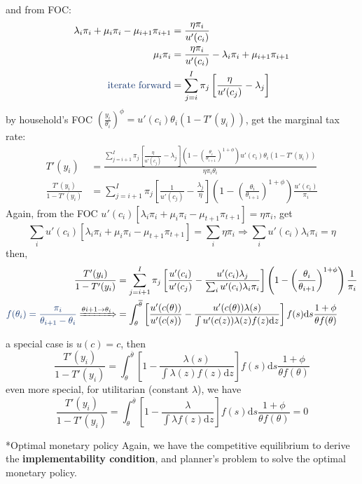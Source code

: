 \documentclass[10pt,landscape,a4paper]{article}
\makeatletter
\let\bar\overline
\renewcommand{\section}{\@startsection{section}{1}{0mm}{1ex}{.2ex}{\normalsize\bfseries}}
\makeatother
\begin{document}
\begin{multicols*}{3}
and from FOC:
\begin{align*}
    \lambda_i\pi_i +\mu_i\pi_i -\mu_{i+1}\pi_{i+1}&=\frac{\eta\pi_i}{u'(c_i)}\\
    \mu_i\pi_i &= \frac{\eta\pi_i}{u'(c_i)}-\lambda_i\pi_i +\mu_{i+1}\pi_{i+1}\\
    \text{\color{myblue}iterate forward} &= \sum^I_{j=i}\pi_j\left[\frac{\eta}{u'(c_j)}-\lambda_j\right]
\end{align*}
by household's FOC $\left(\frac{y_i}{\theta_i}\right)^{\phi} = u'(c_i)\theta_i(1-T'(y_i))$, get the marginal tax rate:
\begin{align*}
    T'(y_i) &= \frac{\sum^I_{j=i+1}\pi_j\left[\frac{\eta}{u'(c_j)}-\lambda_j\right] \left(1- \left(\frac{\theta_i}{\theta_{i+1}}\right)^{1+\phi}\right) u'(c_i)\theta_i(1-T'(y_i))}{\eta\pi_i\theta_i}\\
    \frac{T'(y_i)}{1-T'(y_i)} &= \sum^I_{j=i+1}\pi_j\left[\frac{1}{u'(c_j)}-\frac{\lambda_j}{\eta}\right] \left(1- \left(\frac{\theta_i}{\theta_{i+1}}\right)^{1+\phi}\right) \frac{u'(c_i)}{\pi_i}
\end{align*}
Again, from the FOC $u'(c_i)[\lambda_i\pi_i+\mu_i\pi_i-\mu_{t+1}\pi_{t+1}]=\eta \pi_i$, get
$$
\sum_i u'(c_i)[\lambda_i\pi_i+\mu_i\pi_i-\mu_{t+1}\pi_{t+1}]=\sum_i \eta \pi_i \Rightarrow \sum_i u'(c_i)\lambda_i\pi_i = \eta
$$
then, 
\begin{align*}
    \frac{T'(y_i)}{1-T'(y_i)} &= \sum^I_{j=i+1}\pi_j\left[\frac{u'(c_i)}{u'(c_j)}-\frac{u'(c_i)\lambda_j}{\sum_iu'(c_i)\lambda_i\pi_i}\right] \left(1- \left(\frac{\theta_i}{\theta_{i+1}}\right)^{1+\phi}\right) \frac{1}{\pi_i}\\
   {\color{myblue}f(\theta_i)=\frac{\pi_i}{\theta_{i+1}-\theta_i}} \xRightarrow{\theta{i+1}\rightarrow\theta_i} &= \int^{\bar{\theta}}_{\theta}\left[\frac{u'(c(\theta))}{u'(c(s))} - \frac{u'(c(\theta))\lambda(s)}{\int u'(c(z))\lambda(z)f(z)\mathrm{d}z}\right]f(s)\mathrm{d}s\frac{1+\phi}{\theta f(\theta)}
\end{align*}

a special case is $u(c)=c$, then 
$$
\frac{T'(y_i)}{1-T'(y_i)}=\int^{\bar{\theta}}_{\theta}\left[1 - \frac{\lambda(s)}{\int \lambda(z)f(z)\mathrm{d}z}\right]f(s)\mathrm{d}s\frac{1+\phi}{\theta f(\theta)}
$$
even more special, for utilitarian (constant $\lambda$), we have
$$
\frac{T'(y_i)}{1-T'(y_i)}=\int^{\bar{\theta}}_{\theta}\left[1 - \frac{\lambda}{\int \lambda f(z)\mathrm{d}z}\right]f(s)\mathrm{d}s\frac{1+\phi}{\theta f(\theta)} =0
$$

\section*{Optimal monetary policy}
Again, we have the competitive equilibrium to derive the \textbf{implementability condition}, and planner's problem to solve the optimal monetary policy.

\end{multicols*}
\end{document}
